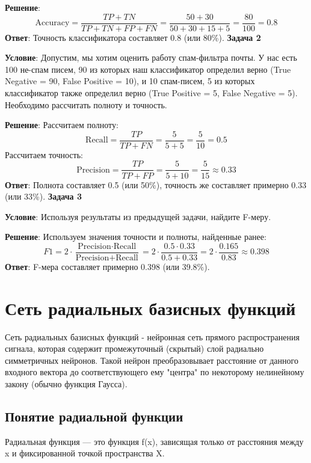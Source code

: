 \textbf{Решение}:
\[
\text{Accuracy} = \frac{TP + TN}{TP + TN + FP + FN} = \frac{50 + 30}{50 + 30 + 15 + 5} = \frac{80}{100} = 0.8
\]
\textbf{Ответ}: Точность классификатора составляет 0.8 (или 80\%).
\newline
\newline
\textbf{Задача 2}

\textbf{Условие}: Допустим, мы хотим оценить работу спам-фильтра почты. У нас есть 100 не-спам писем, 90 из которых наш классификатор определил верно (True Negative = 90, False Positive = 10), и 10 спам-писем, 5 из которых классификатор также определил верно (True Positive = 5, False Negative = 5). Необходимо рассчитать полноту и точность.

\textbf{Решение}:
Рассчитаем полноту:
\[
\text{Recall} = \frac{TP}{TP + FN} = \frac{5}{5 + 5} = \frac{5}{10} = 0.5
\]
Рассчитаем точность:
\[
\text{Precision} = \frac{TP}{TP + FP} = \frac{5}{5 + 10} = \frac{5}{15} \approx 0.33
\]
\textbf{Ответ}: Полнота составляет 0.5 (или 50\%), точность же составляет примерно 0.33 (или 33\%).
\newline
\newline
\textbf{Задача 3}

\textbf{Условие}: Используя результаты из предыдущей задачи, найдите F-меру.

\textbf{Решение}:
Используем значения точности и полноты, найденные ранее:
\[
F1 = 2 \cdot \frac{\text{Precision} \cdot \text{Recall}}{\text{Precision} + \text{Recall}} = 2 \cdot \frac{0.5 \cdot 0.33}{0.5 + 0.33} = 2 \cdot \frac{0.165}{0.83} \approx 0.398
\]
\textbf{Ответ}: F-мера составляет примерно 0.398 (или 39.8\%).

\section*{Сеть радиальных базисных функций}
Сеть радиальных базисных функций - нейронная сеть прямого распространения сигнала, которая содержит промежуточный (скрытый) слой радиально симметричных нейронов. Такой нейрон преобразовывает расстояние от данного входного вектора до соответствующего ему "центра" по некоторому нелинейному закону (обычно функция Гаусса).

\subsection*{Понятие радиальной функции}

Радиальная функция — это функция f(x), зависящая только от расстояния между x и фиксированной точкой пространства X.

